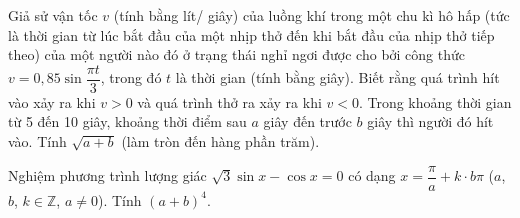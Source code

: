 \begin{ex}
	Giả sử vận tốc $v$ (tính bằng lít/ giây) của luồng khí trong một chu kì hô hấp (tức là thời gian từ lúc bắt đầu của một nhịp thở đến khi bắt đầu của nhịp thở tiếp theo) của một người nào đó ở trạng thái nghỉ ngơi được cho bởi công thức $v=0{,}85\sin \dfrac{\pi t}{3}$, trong đó $t$ là thời gian (tính bằng giây). Biết rằng quá trình hít vào xảy ra khi $v>0$ và quá trình thở ra xảy ra khi $v<0$. Trong khoảng thời gian từ 5 đến 10 giây, khoảng thời điểm sau $a$ giây đến trước $b$ giây thì người đó hít vào. Tính $\sqrt{a+b}$ (làm tròn đến hàng phần trăm).
\end{ex}
\begin{ex}
	Nghiệm phương trình lượng giác $\sqrt{3}\sin x-\cos x=0$ có dạng $x=\dfrac{\pi }{a}+k \cdot b\pi $ ($a$, $b$, $k\in \mathbb{Z}$, $a\ne 0$). Tính $(a+b)^4$.
\end{ex}
